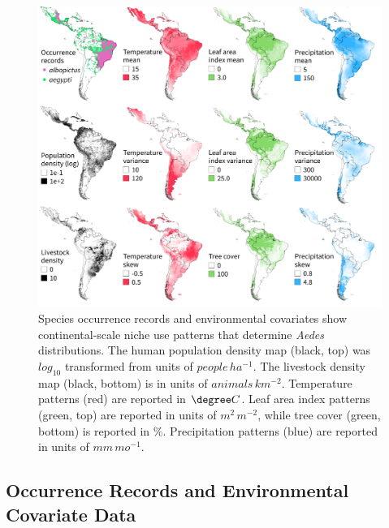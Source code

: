 \begin{figure}[!ht]
\includegraphics[width=\textwidth]{figures/ch3-map-covariates.pdf}
\centering
\caption[Species occurrence records and environmental covariates show continental-scale niche use patterns that determine \textit{Aedes} distributions.]{Species occurrence records and environmental covariates show continental-scale niche use patterns that determine \textit{Aedes} distributions. The human population density map (black, top) was $log_10$ transformed from units of $people\, ha^{-1}$. The livestock density map (black, bottom) is in units of $animals\, km^{-2}$. Temperature patterns (red) are reported in $\degree C$. Leaf area index patterns (green, top) are reported in units of $m^2\, m^{-2}$, while tree cover (green, bottom) is reported in $\%$. Precipitation patterns (blue) are reported in units of $mm\, mo^{-1}$.}
\label{fig:map-covariates}
\end{figure}

\subsection{Occurrence Records and Environmental Covariate Data}

